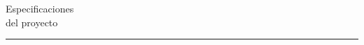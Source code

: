 \documentclass[14pt]{extarticle}
\author{
    Barrientos Álvarez Jorge Miguel Aaron \vspace{20pt}\\
    Onofre Martínez Maximiliano \vspace{20pt}\\
    Ortíz Amaya Bruno Fernando \vspace{20pt}\\
    Reyes López Eduardo Alfonso \vspace{20pt} \\
    Salazar Zaragoza Helen Michelle 
    }
\makeatletter
\def\printauthor{              
    {\large \@author}}
\makeatother
\begin{document}
	   
\begin{titlepage}
    \noindent
    \titlefont Especificaciones \\del proyecto
    \vfill
    \hfill
    \begin{minipage}{0.35\linewidth}
        \begin{flushright}
            \printauthor
        \end{flushright}
    \end{minipage}
    \begin{minipage}{0.02\linewidth}
        \rule{1pt}{300pt}
    \end{minipage}
    \end{titlepage}
    
    \newpage
    
    \newpage
    
\end{document}
